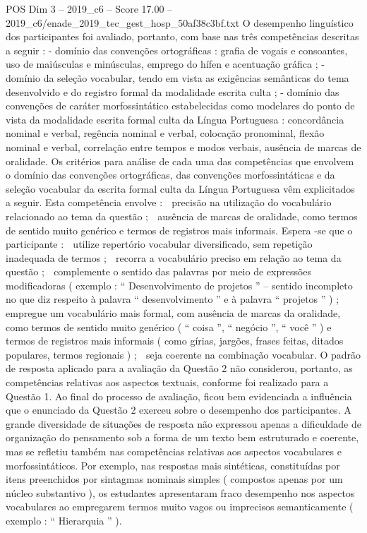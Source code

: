 \begin{textsample}{POS Dim 3 – 2019\_c6 – Score 17.00 – 2019\_c6/enade\_2019\_tec\_gest\_hosp\_50af38c3bf.txt}
O desempenho linguístico dos participantes foi avaliado, portanto, com base nas três competências descritas a seguir : - domínio das convenções ortográficas : grafia de vogais e consoantes, uso de maiúsculas e minúsculas, emprego do hífen e acentuação gráfica ; - domínio da seleção vocabular, tendo em vista as exigências semânticas do tema desenvolvido e do registro formal da modalidade escrita culta ; - domínio das convenções de caráter morfossintático estabelecidas como modelares do ponto de vista da modalidade escrita formal culta da Língua Portuguesa : concordância nominal e verbal, regência nominal e verbal, colocação pronominal, flexão nominal e verbal, correlação entre tempos e modos verbais, ausência de marcas de oralidade.
Os critérios para análise de cada uma das competências que envolvem o domínio das convenções ortográficas, das convenções morfossintáticas e da seleção vocabular da escrita formal culta da Língua Portuguesa vêm explicitados a seguir.
Esta competência envolve :  precisão na utilização do vocabulário relacionado ao tema da questão ;  ausência de marcas de oralidade, como termos de sentido muito genérico e termos de registros mais informais.
Espera -se que o participante :  utilize repertório vocabular diversificado, sem repetição inadequada de termos ;  recorra a vocabulário preciso em relação ao tema da questão ;  complemente o sentido das palavras por meio de expressões modificadoras ( exemplo : “ Desenvolvimento de projetos ” – sentido incompleto no que diz respeito à palavra “ desenvolvimento ” e à palavra “ projetos ” ) ;  empregue um vocabulário mais formal, com ausência de marcas da oralidade, como termos de sentido muito genérico ( “ coisa ”, “ negócio ”, “ você ” ) e termos de registros mais informais ( como gírias, jargões, frases feitas, ditados populares, termos regionais ) ;  seja coerente na combinação vocabular.
O padrão de resposta aplicado para a avaliação da Questão 2 não considerou, portanto, as competências relativas aos aspectos textuais, conforme foi realizado para a Questão 1.
Ao final do processo de avaliação, ficou bem evidenciada a influência que o enunciado da Questão 2 exerceu sobre o desempenho dos participantes.
A grande diversidade de situações de resposta não expressou apenas a dificuldade de organização do pensamento sob a forma de um texto bem estruturado e coerente, mas se refletiu também nas competências relativas aos aspectos vocabulares e morfossintáticos.
Por exemplo, nas respostas mais sintéticas, constituídas por itens preenchidos por sintagmas nominais simples ( compostos apenas por um núcleo substantivo ), os estudantes apresentaram fraco desempenho nos aspectos vocabulares ao empregarem termos muito vagos ou imprecisos semanticamente ( exemplo : “ Hierarquia ” ).

\end{textsample}
